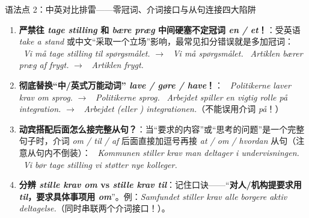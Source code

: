 \begin{grammatikbox}{语法点 2：中英对比排雷——零冠词、介词接口与从句连接四大陷阱}
\begin{enumerate}
  \item \textbf{严禁往 \textit{tage stilling} 和 \textit{bære præg} 中间硬塞不定冠词 \textit{en / et}！}：受英语 \textit{take a stand} 或中文“采取一个立场”影响，最常见扣分错误就是多加冠词：\newline
    \ \textit{Vi må tage  stilling til spørgsmålet.} $\rightarrow$ \ \textit{Vi må  spørgsmålet.}\newline
    \ \textit{Artiklen bærer  præg af frygt.} $\rightarrow$ \ \textit{Artiklen  frygt.}
  \item \textbf{彻底替换“中/英式万能动词” \textit{lave / gøre / have}！}：\newline
    \ \textit{Politikerne laver krav om sprog.} $\rightarrow$ \ \textit{Politikerne  sprog.}\newline
    \ \textit{Arbejdet spiller en vigtig rolle på integration.} $\rightarrow$ \ \textit{Arbejdet  (eller ) integrationen.}（不能误用介词 \textit{på}！）
  \item \textbf{动宾搭配后面怎么接完整从句？}：当“要求的内容”或“思考的问题”是一个完整句子时，介词 \textit{om / til / af} 后面直接加逗号再接 \textit{at / om / hvordan} 从句（注意从句内不倒装）：\newline
    \ \textit{Kommunen stiller krav  man deltager i undervisningen.}\newline
    \ \textit{Vi bør tage stilling  vi støtter nye kolleger.}
  \item \textbf{分辨 \textit{stille krav om} vs \textit{stille krav til}}：记住口诀——“\textbf{对人/机构提要求用 \textit{til}，要求具体事项用 \textit{om}}”。例：\textit{Samfundet stiller krav  alle borgere  aktiv deltagelse.}（同时串联两个介词接口！）。
\end{enumerate}
\end{grammatikbox}


